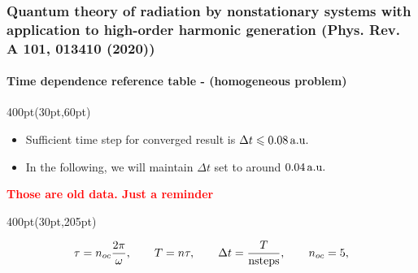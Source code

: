 %
%
%
%
%
%



\begin{frame}
\frametitle{Quantum theory of radiation by nonstationary systems 
	with application to high-order harmonic generation
        (Phys. Rev. A 101, 013410 (2020))}
	\framesubtitle{Time dependence reference table - (homogeneous problem)}
\small

\begin{textblock*}{400pt}(30pt,60pt)
\footnotesize
\begin{itemize}
\item Sufficient time step for converged result is 
$\Delta t \leqslant 0.08\,\rm a.u.$
\item In the following, we will maintain $\Delta t$ set to 
around $0.04\,\rm a.u.$
\end{itemize}


	\textcolor{red}{\textbf{Those are old data. Just a reminder}}\\

\end{textblock*}

{
\tiny 

}


\begin{textblock*}{400pt}(30pt,205pt)
\scriptsize

\begin{align}
    \tau = n_{oc}\frac{2\pi}{\omega}, \hspace{20pt}
    T = n \tau, \hspace{20pt}
    \Delta t  = \frac{T}{{\rm nsteps}}, \hspace{20pt}
    n_{oc}  = 5,
                \nonumber
\end{align}

\end{textblock*}

\end{frame}




